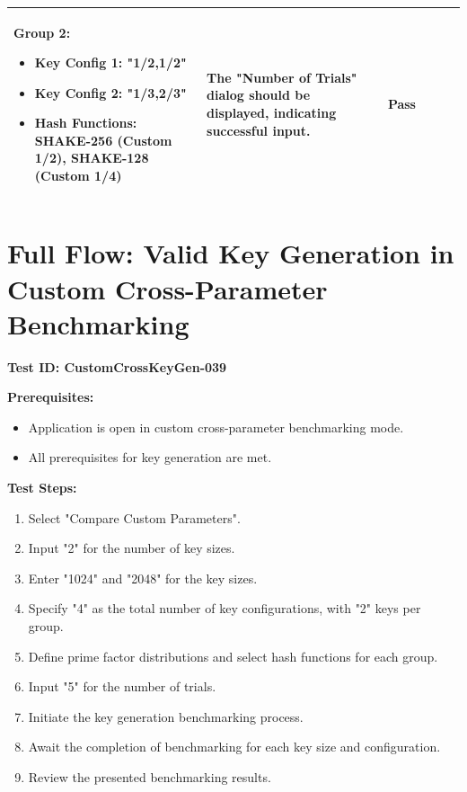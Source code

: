 \documentclass[]{final_report}
\theoremstyle{definition}
\begin{document}
\begin{longtable}{|p{1.5cm}|p{2.5cm}|p{3.5cm}|p{3.0cm}|p{3cm}|p{2cm}|}
Group 2:
\begin{itemize}
  \item Key Config 1: "1/2,1/2"
  \item Key Config 2: "1/3,2/3"
  \item Hash Functions: SHAKE-256 (Custom 1/2), SHAKE-128 (Custom 1/4)
\end{itemize}
 & The "Number of Trials" dialog should be displayed, indicating successful input. & Pass \\
  \hline
 
  \end{longtable}

\section*{Full Flow: Valid Key Generation in Custom Cross-Parameter Benchmarking}

\textbf{Test ID: CustomCrossKeyGen-039}

\textbf{Prerequisites:}
\begin{itemize}
    \item Application is open in custom cross-parameter benchmarking mode.
    \item All prerequisites for key generation are met.
\end{itemize}

\textbf{Test Steps:}
\begin{enumerate}
    \item Select "Compare Custom Parameters".
    \item Input "2" for the number of key sizes.
    \item Enter "1024" and "2048" for the key sizes.
    \item Specify "4" as the total number of key configurations, with "2" keys per group.
    \item Define prime factor distributions and select hash functions for each group.
    \item Input "5" for the number of trials.
    \item Initiate the key generation benchmarking process.
    \item Await the completion of benchmarking for each key size and configuration.
    \item Review the presented benchmarking results.
\end{enumerate}
\end{document}
